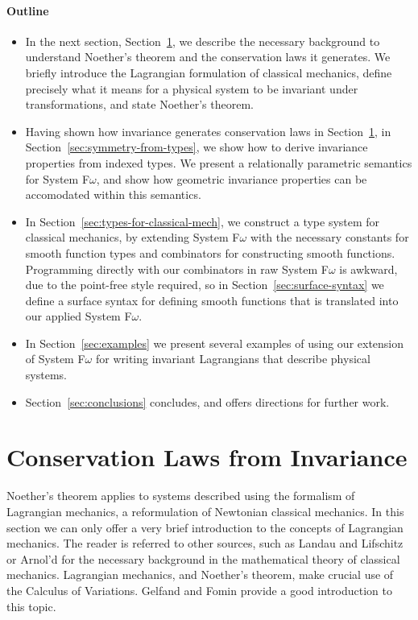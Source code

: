 \documentclass[preprint]{sigplanconf}
\theoremstyle{examplestyle}
\begin{document}
\paragraph{Outline}

\begin{itemize}
\item In the next section,
  Section~\ref{sec:conservation-laws-from-symmetry}, we describe the
  necessary background to understand Noether's theorem and the
  conservation laws it generates. We briefly introduce the Lagrangian
  formulation of classical mechanics, define precisely what it means
  for a physical system to be invariant under transformations, and
  state Noether's theorem.
\item Having shown how invariance generates conservation laws in
  Section~\ref{sec:conservation-laws-from-symmetry}, in
  Section~\ref{sec:symmetry-from-types}, we show how to derive
  invariance properties from indexed types. We present a relationally
  parametric semantics for System F$\omega$, and show how geometric
  invariance properties can be accomodated within this semantics.
\item In Section~\ref{sec:types-for-classical-mech}, we construct a
  type system for classical mechanics, by extending System F$\omega$
  with the necessary constants for smooth function types and
  combinators for constructing smooth functions. Programming directly
  with our combinators in raw System F$\omega$ is awkward, due to the
  point-free style required, so in Section~\ref{sec:surface-syntax} we
  define a surface syntax for defining smooth functions that is
  translated into our applied System F$\omega$.
\item In Section~\ref{sec:examples} we present several examples of
  using our extension of System F$\omega$ for writing invariant
  Lagrangians that describe physical systems.
\item Section~\ref{sec:conclusions} concludes, and offers directions
  for further work.
\end{itemize}

\section{Conservation Laws from Invariance}
\label{sec:conservation-laws-from-symmetry}

Noether's theorem applies to systems described using the formalism of
Lagrangian mechanics, a reformulation of Newtonian classical
mechanics. In this section we can only offer a very brief introduction
to the concepts of Lagrangian mechanics. The reader is referred to
other sources, such as Landau and Lifschitz \cite{landau60mechanics}
or Arnol'd \cite{arnold89mathematical} for the necessary background in
the mathematical theory of classical mechanics. Lagrangian mechanics,
and Noether's theorem, make crucial use of the Calculus of
Variations. Gelfand and Fomin \cite{gelfand00calculus} provide a good
introduction to this topic.
\end{document}
